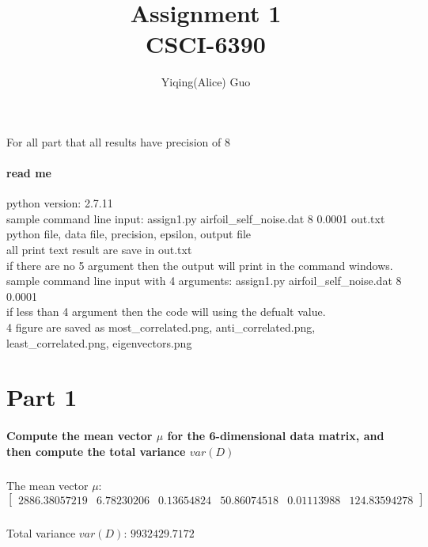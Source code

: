 \documentclass{article}
\author{Yiqing(Alice) Guo}
\title{Assignment 1\\ \large CSCI-6390}
\begin{document}
\maketitle
\paragraph{}For all part that all results have precision of 8
\paragraph{read me\\}
python version:  2.7.11
\\sample command line input: assign1.py airfoil\_self\_noise.dat 8 0.0001 out.txt
\\python file, data file, precision, epsilon, output file
\\all print text result are save in out.txt
\\if there are no 5 argument then the output will print in the command windows.
\\sample command line input with 4 arguments: assign1.py airfoil\_self\_noise.dat 8 0.0001
\\if less than 4 argument then the code will using the defualt value.
\\4 figure are saved as most\_correlated.png, anti\_correlated.png, least\_correlated.png, eigenvectors.png 
\section{Part 1}
\paragraph{Compute the mean vector $\mu$ for the 6-dimensional data matrix, and then compute the total variance  $var(D)$}
\subparagraph{}The mean vector $\mu$: \[ 
\begin{bmatrix}2886.38057219  &   6.78230206 &    0.13654824   & 50.86074518    & 0.01113988
   &124.83594278\end{bmatrix}\]
\subparagraph{}Total variance  $var(D)$: $9932429.7172$
\end{document}
